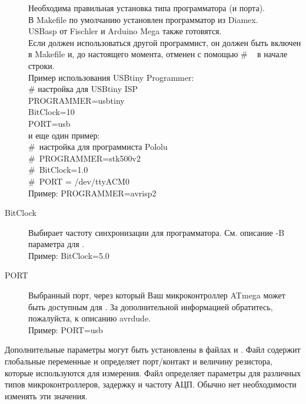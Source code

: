 \begin{description}
Необходима правильная установка типа программатора (и порта). \\
В Makefile по умолчанию установлен программатор из Diamex. \\
USBasp от Fischler и Arduino Mega также готовятся. \\
Если должен использоваться другой программист, он должен быть включен в Makefile и, до настоящего момента, отменен с помощью \# ~ в начале строки. \\
Пример использования USBtiny Programmer: \\
\# настройка для USBtiny ISP\\
PROGRAMMER=usbtiny\\
BitClock=10\\
PORT=usb\\
и еще один пример:\\
\#~настройка для программиста Pololu\\
\#~PROGRAMMER=stk500v2\\
\#~BitClock=1.0\\
\#~PORT = /dev/ttyACM0\\
Пример: PROGRAMMER=avrisp2


  \item[BitClock] Выбирает частоту синхронизации для программатора. См. описание -B параметра для .\\
Пример: BitClock=5.0

  \item[PORT] Выбранный порт, через который Ваш микроконтроллер ATmega может быть доступным для . За 
дополнительной информацией обратитесь, пожалуйста, к описанию avrdude.\\
Пример: PORT=usb

\end{description}

Дополнительные параметры могут быть установлены в файлах  и .
Файл  содержит глобальные переменные и определяет порт/контакт и величину резистора,
которые используются для измерения. Файл  определяет параметры для различных типов микроконтроллеров, задержку и частоту АЦП. Обычно нет 
необходимости изменять эти значения.

